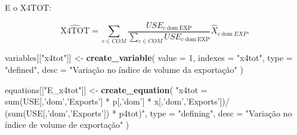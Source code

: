 \documentclass[12pt,twoside]{article}
\newenvironment{Shaded}{\begin{snugshade}}{\end{snugshade}}
\newcommand{\DataTypeTok}[1]{\textcolor[rgb]{0.13,0.29,0.53}{#1}}
\newcommand{\DecValTok}[1]{\textcolor[rgb]{0.00,0.00,0.81}{#1}}
\newcommand{\KeywordTok}[1]{\textcolor[rgb]{0.13,0.29,0.53}{\textbf{#1}}}
\newcommand{\NormalTok}[1]{#1}
\newcommand{\StringTok}[1]{\textcolor[rgb]{0.31,0.60,0.02}{#1}}
\let\oldShaded\Shaded
\let\endoldShaded\endShaded
\renewenvironment{Shaded}{\footnotesize\oldShaded}{\endoldShaded}
\begin{document}
E o X4TOT:

\[\hat{\text{X4TOT}} = \sum_{c\in COM}\frac{USE_{c~\text{dom}~\text{EXP}}}{\sum_{c\in COM}USE_{c~\text{dom}~\text{EXP}}}\hat{X}_{c~\text{dom}~EXP}.\]

\begin{Shaded}
\begin{Highlighting}[]
\NormalTok{variables[[}\StringTok{"x4tot"}\NormalTok{]] <-}\StringTok{ }\KeywordTok{create_variable}\NormalTok{(}
  \DataTypeTok{value =} \DecValTok{1}\NormalTok{,}
  \DataTypeTok{indexes =} \StringTok{"x4tot"}\NormalTok{,}
  \DataTypeTok{type =} \StringTok{"defined"}\NormalTok{,}
  \DataTypeTok{desc =} \StringTok{"Variação no índice de volume da exportação"}
\NormalTok{)}

\NormalTok{equations[[}\StringTok{"E_x4tot"}\NormalTok{]] <-}\StringTok{ }\KeywordTok{create_equation}\NormalTok{(}
  \StringTok{"x4tot = sum(USE[,'dom','Exports'] * p[,'dom'] * x[,'dom','Exports'])/}
\StringTok{  (sum(USE[,'dom','Exports']) * p4tot)"}\NormalTok{,}
  \DataTypeTok{type =} \StringTok{"defining"}\NormalTok{,}
  \DataTypeTok{desc =} \StringTok{"Variação no índice de volume de exportação"}
\NormalTok{)}
\end{Highlighting}
\end{Shaded}
\end{document}
